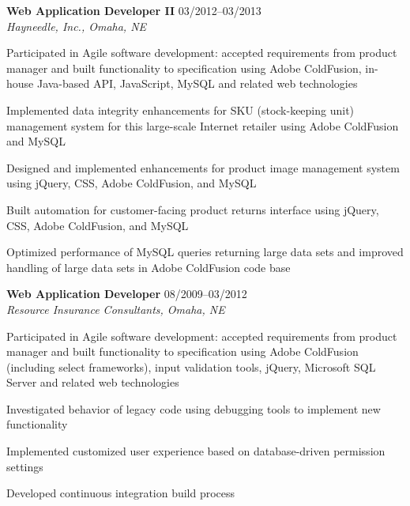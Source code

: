 \begin{itemize1}
	\item \textbf{Web Application Developer II} \textopenbullet{} 03/2012--03/2013 \\
		\textit{Hayneedle, Inc., Omaha, NE} \vspace{-1.5mm}
		\begin{itemize1}
			\item Participated in Agile software development: accepted requirements from product manager and built functionality to specification using Adobe ColdFusion, in-house Java-based API, JavaScript, MySQL and related web technologies
			\item Implemented data integrity enhancements for SKU (stock-keeping unit) management system for this large-scale Internet retailer using Adobe ColdFusion and MySQL
			\item Designed and implemented enhancements for product image management system using jQuery, CSS, Adobe ColdFusion, and MySQL
			\item Built automation for customer-facing product returns interface using jQuery, CSS, Adobe ColdFusion, and MySQL
			\item Optimized performance of MySQL queries returning large data sets and improved handling of large data sets in Adobe ColdFusion code base
		\end{itemize1}
	\item \textbf{Web Application Developer} \textopenbullet{} 08/2009--03/2012 \\
		\textit{Resource Insurance Consultants, Omaha, NE} \vspace{-1.5mm}
		\begin{itemize1}
 			\item Participated in Agile software development: accepted requirements from product manager and built functionality to specification using Adobe ColdFusion (including select frameworks), input validation tools, jQuery, Microsoft SQL Server and related web technologies
 			\item Investigated behavior of legacy code using debugging tools to implement new functionality	
			\item Implemented customized user experience based on database-driven permission settings
			\item Developed continuous integration build process
		\end{itemize1}

\end{itemize1}

